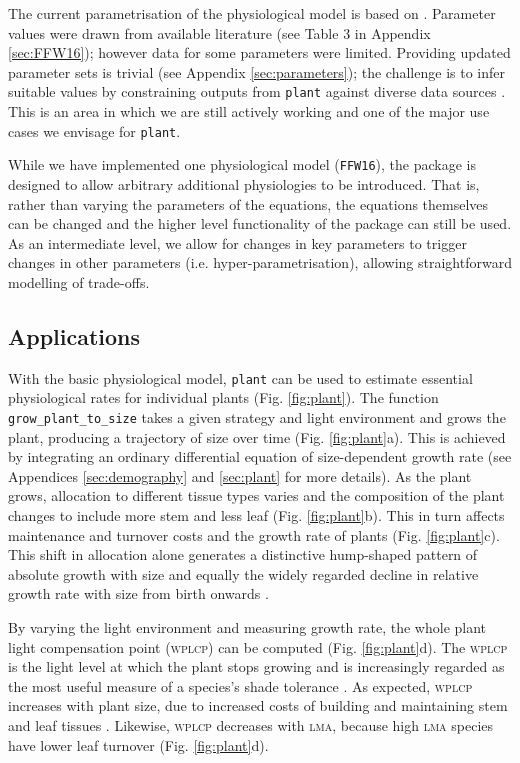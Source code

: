 \documentclass[a4paper,11pt]{article}
\newcommand{\plant}{\texttt{plant}}
\begin{document}
The current parametrisation of the physiological model is based on
\citet{Falster-2011}. Parameter values were drawn from available
literature (see Table 3 in Appendix \ref{sec:FFW16}); however data for
some parameters were limited. Providing updated parameter sets is
trivial (see Appendix \ref{sec:parameters}); the challenge is to infer
suitable values by constraining outputs from {\plant} against diverse
data sources \citep{Lebauer-2012, Keenan-2013}. This is an area in
which we are still actively working and one of the major use cases we
envisage for {\plant}.

While we have implemented one physiological model (\texttt{FFW16}),
the package is designed to allow arbitrary additional physiologies to
be introduced.  That is, rather than varying the parameters of the
equations, the equations themselves can be changed and the higher
level functionality of the package can still be used.  As an
intermediate level, we allow for changes in key parameters to trigger
changes in other parameters (i.e. hyper-parametrisation), allowing
straightforward modelling of trade-offs.

\subsection{Applications}

With the basic physiological model, {\plant} can be used to estimate
essential physiological rates for individual plants
(Fig. \ref{fig:plant}). The function \texttt{grow\_plant\_to\_size}
takes a given strategy and light environment and grows the plant,
producing a trajectory of size over time (Fig. \ref{fig:plant}a). This
is achieved by integrating an ordinary differential equation of
size-dependent growth rate (see Appendices \ref{sec:demography} and
\ref{sec:plant} for more details). As the plant grows, allocation to
different tissue types varies and the composition of the plant
changes to include more stem and less leaf
(Fig. \ref{fig:plant}b). This in turn affects maintenance and turnover
costs and the growth rate of plants (Fig. \ref{fig:plant}c).  This
shift in allocation alone generates a distinctive hump-shaped pattern
of absolute growth with size \citep{King-2011} and equally the widely
regarded decline in relative growth rate with size from birth onwards
\citep{Enquist-2007}.

By varying the light environment and measuring growth rate, the whole
plant light compensation point (\textsc{wplcp}) can be computed (Fig.
\ref{fig:plant}d). The \textsc{wplcp} is the light level at which the plant 
stops growing and is increasingly regarded as the most useful
measure of a species's shade tolerance
\citep{Givnish-1988, Baltzer-2007, Lusk-2013}. As expected, \textsc{wplcp}
increases with plant size, due to increased costs of building and
maintaining stem and leaf tissues \citep{Givnish-1988}. Likewise, \textsc{wplcp}
decreases with \textsc{lma}, because high \textsc{lma} species have lower leaf turnover
\citep{Baltzer-2007, Lusk-2013} (Fig.
\ref{fig:plant}d).
\end{document}
